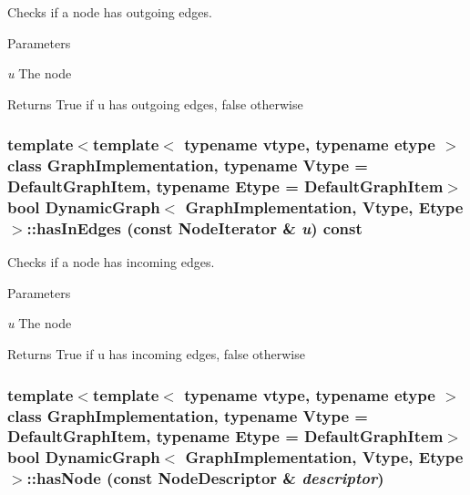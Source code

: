 Checks if a node has outgoing edges. 


\begin{DoxyParams}{Parameters}
\item[{\em u}]The node \end{DoxyParams}
\begin{DoxyReturn}{Returns}
True if u has outgoing edges, false otherwise 
\end{DoxyReturn}
\hypertarget{class_dynamic_graph_a4d753757a2a83708ddaabee45318c523}{
\subsubsection[{hasInEdges}]{\setlength{\rightskip}{0pt plus 5cm}template$<$template$<$ typename vtype, typename etype $>$ class GraphImplementation, typename Vtype  = DefaultGraphItem, typename Etype  = DefaultGraphItem$>$ bool {\bf DynamicGraph}$<$ GraphImplementation, Vtype, Etype $>$::hasInEdges (const NodeIterator \& {\em u}) const}}
\label{class_dynamic_graph_a4d753757a2a83708ddaabee45318c523}


Checks if a node has incoming edges. 


\begin{DoxyParams}{Parameters}
\item[{\em u}]The node \end{DoxyParams}
\begin{DoxyReturn}{Returns}
True if u has incoming edges, false otherwise 
\end{DoxyReturn}
\hypertarget{class_dynamic_graph_ab5c40bda53d5e3cd1e03078a64982384}{
\subsubsection[{hasNode}]{\setlength{\rightskip}{0pt plus 5cm}template$<$template$<$ typename vtype, typename etype $>$ class GraphImplementation, typename Vtype  = DefaultGraphItem, typename Etype  = DefaultGraphItem$>$ bool {\bf DynamicGraph}$<$ GraphImplementation, Vtype, Etype $>$::hasNode (const NodeDescriptor \& {\em descriptor})}}
\label{class_dynamic_graph_ab5c40bda53d5e3cd1e03078a64982384}


